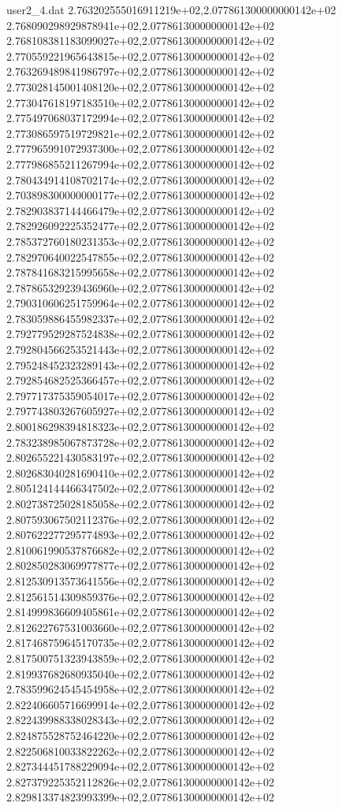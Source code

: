 \begin{filecontents}{user2_4.dat}
2.763202555016911219e+02,2.077861300000000142e+02
2.768090298929878941e+02,2.077861300000000142e+02
2.768108381183099027e+02,2.077861300000000142e+02
2.770559221965643815e+02,2.077861300000000142e+02
2.763269489841986797e+02,2.077861300000000142e+02
2.773028145001408120e+02,2.077861300000000142e+02
2.773047618197183510e+02,2.077861300000000142e+02
2.775497068037172994e+02,2.077861300000000142e+02
2.773086597519729821e+02,2.077861300000000142e+02
2.777965991072937300e+02,2.077861300000000142e+02
2.777986855211267994e+02,2.077861300000000142e+02
2.780434914108702174e+02,2.077861300000000142e+02
2.703898300000000177e+02,2.077861300000000142e+02
2.782903837144466479e+02,2.077861300000000142e+02
2.782926092225352477e+02,2.077861300000000142e+02
2.785372760180231353e+02,2.077861300000000142e+02
2.782970640022547855e+02,2.077861300000000142e+02
2.787841683215995658e+02,2.077861300000000142e+02
2.787865329239436960e+02,2.077861300000000142e+02
2.790310606251759964e+02,2.077861300000000142e+02
2.783059886455982337e+02,2.077861300000000142e+02
2.792779529287524838e+02,2.077861300000000142e+02
2.792804566253521443e+02,2.077861300000000142e+02
2.795248452323289143e+02,2.077861300000000142e+02
2.792854682525366457e+02,2.077861300000000142e+02
2.797717375359054017e+02,2.077861300000000142e+02
2.797743803267605927e+02,2.077861300000000142e+02
2.800186298394818323e+02,2.077861300000000142e+02
2.783238985067873728e+02,2.077861300000000142e+02
2.802655221430583197e+02,2.077861300000000142e+02
2.802683040281690410e+02,2.077861300000000142e+02
2.805124144466347502e+02,2.077861300000000142e+02
2.802738725028185058e+02,2.077861300000000142e+02
2.807593067502112376e+02,2.077861300000000142e+02
2.807622277295774893e+02,2.077861300000000142e+02
2.810061990537876682e+02,2.077861300000000142e+02
2.802850283069977877e+02,2.077861300000000142e+02
2.812530913573641556e+02,2.077861300000000142e+02
2.812561514309859376e+02,2.077861300000000142e+02
2.814999836609405861e+02,2.077861300000000142e+02
2.812622767531003660e+02,2.077861300000000142e+02
2.817468759645170735e+02,2.077861300000000142e+02
2.817500751323943859e+02,2.077861300000000142e+02
2.819937682680935040e+02,2.077861300000000142e+02
2.783599624545454958e+02,2.077861300000000142e+02
2.822406605716699914e+02,2.077861300000000142e+02
2.822439988338028343e+02,2.077861300000000142e+02
2.824875528752464220e+02,2.077861300000000142e+02
2.822506810033822262e+02,2.077861300000000142e+02
2.827344451788229094e+02,2.077861300000000142e+02
2.827379225352112826e+02,2.077861300000000142e+02
2.829813374823993399e+02,2.077861300000000142e+02

\end{filecontents}
